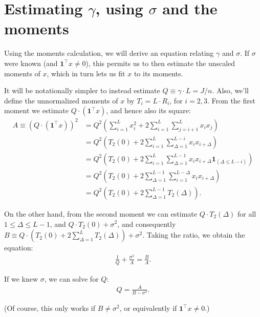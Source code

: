 \documentclass{article}
\theoremstyle{thm}
\theoremstyle{definition}
\newcommand{\1}{\mathbf{1}}
\begin{document}
%
%
%

\section{Estimating $\gamma$, using $\sigma$ and the moments}

Using the moments calculation, we will derive an equation relating $\gamma$ and $\sigma$. If $\sigma$ were known (and $\1^\top x \ne 0$), this permits us to then estimate the unscaled moments of $x$, which in turn lets us fit $x$ to its moments.

It will be notationally simpler to instead estimate $Q \equiv \gamma \cdot L = J / n$. Also, we'll define the unnormalized moments of $x$ by $T_i = L \cdot R_i$, for $i=2,3$. From the first moment we estimate $Q \cdot (\1^\top x)$, and hence also its square:
%
\begin{align}
%
    A \equiv (Q \cdot (\1^\top x))^2 
    &= Q^2  \left( \sum_{i=1}^L x_i^2 + 2 \sum_{i=1}^L \sum_{j=i+1}^{L} x_i x_j \right)
        \nonumber \\
    &= Q^2 \left( T_2(0) 
            + 2 \sum_{i=1}^{L} \sum_{\Delta=1}^{L-i} x_i x_{i+\Delta}\right)
        \nonumber \\
    &= Q^2 \left( T_2(0) + 2 \sum_{i=1}^L \sum_{\Delta=1}^{L-1}x_i x_{i+\Delta} 
        \1_{(\Delta \le L-i)} \right)
        \nonumber \\
    &= Q^2 \left( T_2(0) + 2 \sum_{\Delta=1}^{L-1} \sum_{i=1}^{L-\Delta}x_i x_{i+\Delta} 
        \right)
        \nonumber \\
    &= Q^2 \left( T_2(0) + 2 \sum_{\Delta=1}^{L-1} T_2(\Delta) \right).
%
\end{align}

On the other hand, from the second moment we can estimate $Q \cdot T_2(\Delta)$ for all $1 \le \Delta \le L-1$, and $Q\cdot T_2(0) + \sigma^2$, and consequently $B \equiv Q \cdot (T_2(0) + 2 \sum_{\Delta=1}^L T_2(\Delta)) + \sigma^2$. Taking the ratio, we obtain the equation:
%
\begin{align}
%
    \frac{1}{Q} + \frac{\sigma^2}{A} = \frac{B}{A}.
%
\end{align}

If we knew $\sigma$, we can solve for $Q$:
%
\begin{align}
%
    Q = \frac{A}{B - \sigma^2}.
%
\end{align}

(Of course, this only works if $B \ne \sigma^2$, or equivalently if $\1^\top x \ne 0$.)
\end{document}
